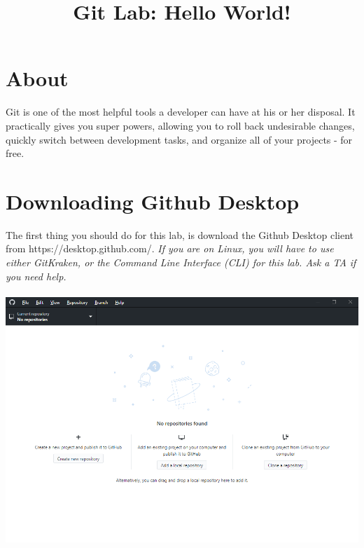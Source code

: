 \documentclass[12pt, letter]{article}
\title{Git Lab: Hello World!}
\begin{document}
    \maketitle
    \tableofcontents
    
    \section{About}
    Git is one of the most helpful tools a developer can have at his or her disposal. It practically gives you super powers, allowing you to roll back undesirable changes, quickly switch between development tasks, and organize all of your projects - for free.
    
    \section{Downloading Github Desktop}
    The first thing you should do for this lab, is download the Github Desktop client from https://desktop.github.com/. \emph{If you are on Linux, you will have to use either GitKraken, or the Command Line Interface (CLI) for this lab. Ask a TA if you need help.} \\ \\
    \includegraphics{screenshots/shot1.bmp}
    
\end{document}
